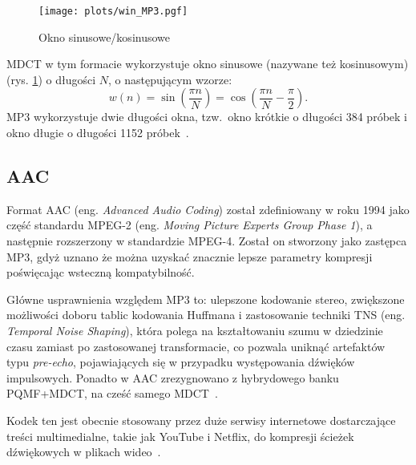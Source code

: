 \documentclass[pl,12pt]{aghdpl}
\let\Oldsubsection\subsection%
\renewcommand{\subsection}{\FloatBarrier\Oldsubsection}
\begin{document}
\begin{figure}[!tbh]
  \centering
  \texttt{[image: plots/win\_MP3.pgf]}
  \caption{Okno sinusowe/kosinusowe}
  \label{fig:win_MP3}
\end{figure}

MDCT w tym formacie wykorzystuje okno sinusowe (nazywane też kosinusowym) (rys.
\ref{fig:win_MP3}) o długości $N$, o następującym wzorze:
\begin{equation}\label{eq:sine_win}
  w(n) = \sin\left(\frac{\pi n}{N}\right) = \cos\left(\frac{\pi n}{N} - \frac{\pi}{2}\right).
\end{equation}
MP3 wykorzystuje dwie długości okna, tzw.\ okno krótkie o długości 384 próbek i okno
długie o długości 1152 próbek~\cite{KimRafii2018}.

\subsection{AAC}
Format AAC (eng. \textit{Advanced Audio Coding}) został zdefiniowany w roku 1994
jako część standardu MPEG-2 (eng. \textit{Moving Picture Experts Group Phase
1}), a następnie rozszerzony w standardzie MPEG-4. Został on stworzony jako
zastępca MP3, gdyż uznano że można uzyskać znacznie lepsze parametry kompresji
poświęcając wsteczną kompatybilność.

Główne usprawnienia względem MP3 to: ulepszone kodowanie stereo, zwiększone
możliwości doboru tablic kodowania Huffmana i zastosowanie techniki TNS (eng.
\textit{Temporal Noise Shaping}), która polega na kształtowaniu szumu w
dziedzinie czasu zamiast po zastosowanej transformacie, co pozwala uniknąć
artefaktów typu \textit{pre-echo}, pojawiających się w przypadku występowania
dźwięków impulsowych. Ponadto w AAC zrezygnowano z hybrydowego banku PQMF+MDCT,
na cześć samego MDCT~\cite{Brandenburg1999}.

Kodek ten jest obecnie stosowany przez duże serwisy internetowe dostarczające
treści multimedialne, takie jak YouTube i Netflix, do kompresji ścieżek
dźwiękowych w plikach wideo~\cite{YouTubeRecommended, Ronca2013}.
\end{document}
